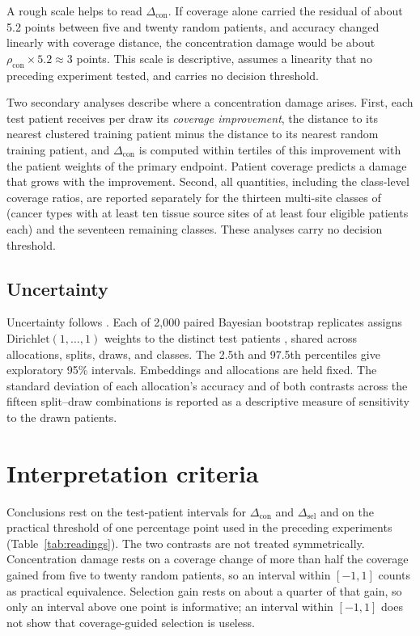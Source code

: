 \documentclass[11pt]{article}
\begin{document}
A rough scale helps to read $\Delta_{\mathrm{con}}$. If coverage alone carried the residual of about 5.2 points between five and twenty random patients, and accuracy changed linearly with coverage distance, the concentration damage would be about $\rho_{\mathrm{con}}\times 5.2\approx 3$ points. This scale is descriptive, assumes a linearity that no preceding experiment tested, and carries no decision threshold.

Two secondary analyses describe where a concentration damage arises. First, each test patient receives per draw its \emph{coverage improvement}, the distance to its nearest clustered training patient minus the distance to its nearest random training patient, and $\Delta_{\mathrm{con}}$ is computed within tertiles of this improvement with the patient weights of the primary endpoint. Patient coverage predicts a damage that grows with the improvement. Second, all quantities, including the class-level coverage ratios, are reported separately for the thirteen multi-site classes of \citet{queisler2026siteCoverage} (cancer types with at least ten tissue source sites of at least four eligible patients each) and the seventeen remaining classes. These analyses carry no decision threshold.

\subsection{Uncertainty}
\label{sec:uncertainty}
Uncertainty follows \citet{queisler2026effectiveSupport}. Each of 2,000 paired Bayesian bootstrap replicates assigns $\mathrm{Dirichlet}(1,\ldots,1)$ weights to the distinct test patients \citep{rubin1981bayesian}, shared across allocations, splits, draws, and classes. The 2.5th and 97.5th percentiles give exploratory 95\% intervals. Embeddings and allocations are held fixed. The standard deviation of each allocation's accuracy and of both contrasts across the fifteen split--draw combinations is reported as a descriptive measure of sensitivity to the drawn patients.

\section{Interpretation criteria}
\label{sec:interpretation}
Conclusions rest on the test-patient intervals for $\Delta_{\mathrm{con}}$ and $\Delta_{\mathrm{sel}}$ and on the practical threshold of one percentage point used in the preceding experiments (Table~\ref{tab:readings}). The two contrasts are not treated symmetrically. Concentration damage rests on a coverage change of more than half the coverage gained from five to twenty random patients, so an interval within $[-1,1]$ counts as practical equivalence. Selection gain rests on about a quarter of that gain, so only an interval above one point is informative; an interval within $[-1,1]$ does not show that coverage-guided selection is useless.
\end{document}
